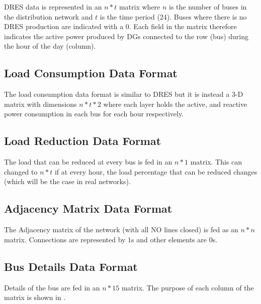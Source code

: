 DRES data is represented in an $n*t$ matrix where $n$ is the number of buses in the distribution network and $t$ is the time period (24). Buses where there is no DRES production are indicated with a $0$. Each field in the matrix therefore indicates the active power produced by DGs connected to the row (bus) during the hour of the day (column).

\subsection*{Load Consumption Data Format}
The load consumption data format is similar to DRES but it is instead a 3-D matrix with dimensions $n*t*2$ where each layer holds the active, and reactive power consumption in each bus for each hour respectively.

\subsection*{Load Reduction Data Format}

The load that can be reduced at every bus is fed in an $n*1$ matrix. This can changed to $n*t$ if at every hour, the load percentage that can be reduced changes (which will be the case in real networks).

\subsection*{Adjacency Matrix Data Format}
The Adjacency matrix of the network (with all NO lines closed) is fed as an $n*n$ matrix. Connections are represented by $1$s and other elements are $0$s.

\subsection*{Bus Details Data Format}
Details of the bus are fed in an $n*15$ matrix. The purpose of each column of the matrix is shown in .

